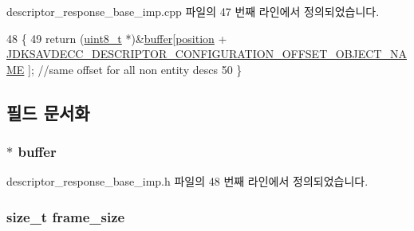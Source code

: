 descriptor\+\_\+response\+\_\+base\+\_\+imp.\+cpp 파일의 47 번째 라인에서 정의되었습니다.


\begin{DoxyCode}
48 \{
49     \textcolor{keywordflow}{return} (\hyperlink{stdint_8h_aba7bc1797add20fe3efdf37ced1182c5}{uint8\_t} *)&\hyperlink{classavdecc__lib_1_1descriptor__response__base__imp_a56ed84df35de10bdb65e72b184309497}{buffer}[\hyperlink{classavdecc__lib_1_1descriptor__response__base__imp_a7a04afe5347934be732ec70a70bd0a28}{position} + 
      \hyperlink{group__descriptor__configuration_ga17380950248abf4f191aeeb51cc8fee7}{JDKSAVDECC\_DESCRIPTOR\_CONFIGURATION\_OFFSET\_OBJECT\_NAME}
      ]; \textcolor{comment}{//same offset for all non entity descs}
50 \}
\end{DoxyCode}


\subsection{필드 문서화}
\subsubsection[{\texorpdfstring{buffer}{buffer}}]{$\ast$ buffer\hspace{0.3cm}{\ttfamily [protected]}}\hypertarget{classavdecc__lib_1_1descriptor__response__base__imp_a56ed84df35de10bdb65e72b184309497}{}\label{classavdecc__lib_1_1descriptor__response__base__imp_a56ed84df35de10bdb65e72b184309497}


descriptor\+\_\+response\+\_\+base\+\_\+imp.\+h 파일의 48 번째 라인에서 정의되었습니다.

\subsubsection[{\texorpdfstring{frame\+\_\+size}{frame_size}}]{\setlength{\rightskip}{0pt plus 5cm}size\+\_\+t frame\+\_\+size\hspace{0.3cm}{\ttfamily [protected]}}\hypertarget{classavdecc__lib_1_1descriptor__response__base__imp_affd041a595cabab98275245b9cb2824d}{}\label{classavdecc__lib_1_1descriptor__response__base__imp_affd041a595cabab98275245b9cb2824d}


